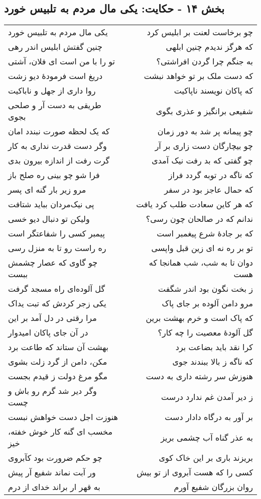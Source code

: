 \begin{center}
\section*{بخش ۱۴ - حکایت: یکی مال مردم به تلبیس خورد}
\label{sec:014}
\begin{longtable}{l p{0.5cm} r}
یکی مال مردم به تلبیس خورد
&&
چو برخاست لعنت بر ابلیس کرد
\\
چنین گفتش ابلیس اندر رهی
&&
که هرگز ندیدم چنین ابلهی
\\
تو را با من است ای فلان، آشتی
&&
به جنگم چرا گردن افراشتی؟
\\
دریغ است فرمودهٔ دیو زشت
&&
که دست ملک بر تو خواهد نبشت
\\
روا داری از جهل و ناباکیت
&&
که پاکان نویسند ناپاکیت
\\
طریقی به دست آر و صلحی بجوی
&&
شفیعی برانگیز و عذری بگوی
\\
که یک لحظه صورت نبندد امان
&&
چو پیمانه پر شد به دور زمان
\\
وگر دست قدرت نداری به کار
&&
چو بیچارگان دست زاری بر آر
\\
گرت رفت از اندازه بیرون بدی
&&
چو گفتی که بد رفت نیک آمدی
\\
فرا شو چو بینی ره صلح باز
&&
که ناگه در توبه گردد فراز
\\
مرو زیر بار گنه ای پسر
&&
که حمال عاجز بود در سفر
\\
پی نیک‌مردان بباید شتافت
&&
که هر کاین سعادت طلب کرد یافت
\\
ولیکن تو دنبال دیو خسی
&&
ندانم که در صالحان چون رسی؟
\\
پیمبر کسی را شفاعتگر است
&&
که بر جادهٔ شرع پیغمبر است
\\
ره راست رو تا به منزل رسی
&&
تو بر ره نه ای زین قبل واپسی
\\
چو گاوی که عصار چشمش ببست
&&
دوان تا به شب، شب همانجا که هست
\\
گل آلوده‌ای راه مسجد گرفت
&&
ز بخت نگون بود اندر شگفت
\\
یکی زجر کردش که تبت یداک
&&
مرو دامن آلوده بر جای پاک
\\
مرا رقتی در دل آمد بر این
&&
که پاک است و خرم بهشت برین
\\
در آن جای پاکان امیدوار
&&
گل آلودهٔ معصیت را چه کار؟
\\
بهشت آن ستاند که طاعت برد
&&
کرا نقد باید بضاعت برد
\\
مکن، دامن از گرد زلت بشوی
&&
که ناگه ز بالا ببندند جوی
\\
مگو مرغ دولت ز قیدم بجست
&&
هنوزش سر رشته داری به دست
\\
وگر دیر شد گرم رو باش و چست
&&
ز دیر آمدن غم ندارد درست
\\
هنوزت اجل دست خواهش نبست
&&
بر آور به درگاه دادار دست
\\
مخسب ای گنه کار خوش خفته، خیز
&&
به عذر گناه آب چشمی بریز
\\
چو حکم ضرورت بود کآبروی
&&
بریزند باری بر این خاک کوی
\\
ور آبت نماند شفیع آر پیش
&&
کسی را که هست آبروی از تو بیش
\\
به قهر ار براند خدای از درم
&&
روان بزرگان شفیع آورم
\\
\end{longtable}
\end{center}
